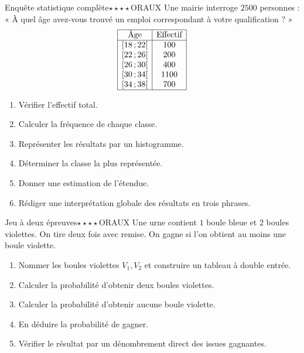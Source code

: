 \documentclass[11pt,a4paper]{article}
\newcommand{\classe}[2]{\ensuremath{[#1\,;#2[}}
\newcounter{exo}
\newcounter{corr}
\begin{document}
\begin{exobox}{Enquête statistique complète}{$\star\star\star\star$}{ORAUX}
Une mairie interroge $2500$ personnes : « À quel âge avez-vous trouvé un emploi correspondant à votre qualification ? »
\[
\begin{array}{|c|c|}
\hline
\text{Âge} & \text{Effectif} \\
\hline
\classe{18}{22} & 100 \\
\classe{22}{26} & 200 \\
\classe{26}{30} & 400 \\
\classe{30}{34} & 1100 \\
\classe{34}{38} & 700 \\
\hline
\end{array}
\]
\begin{enumerate}
\item Vérifier l'effectif total.
\item Calculer la fréquence de chaque classe.
\item Représenter les résultats par un histogramme.
\item Déterminer la classe la plus représentée.
\item Donner une estimation de l'étendue.
\item Rédiger une interprétation globale des résultats en trois phrases.
\end{enumerate}
\end{exobox}

\begin{exobox}{Jeu à deux épreuves}{$\star\star\star\star$}{ORAUX}
Une urne contient $1$ boule bleue et $2$ boules violettes. On tire deux fois avec remise. On gagne si l'on obtient au moins une boule violette.
\begin{enumerate}
\item Nommer les boules violettes $V_1,V_2$ et construire un tableau à double entrée.
\item Calculer la probabilité d'obtenir deux boules violettes.
\item Calculer la probabilité d'obtenir aucune boule violette.
\item En déduire la probabilité de gagner.
\item Vérifier le résultat par un dénombrement direct des issues gagnantes.
\end{enumerate}
\end{exobox}
\end{document}
